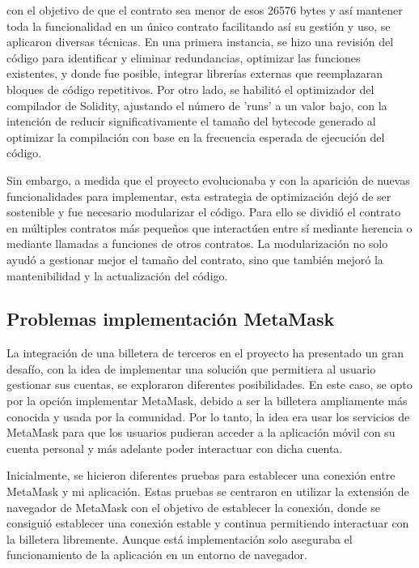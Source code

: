 con el objetivo de que el contrato sea menor de esos 26576 bytes y así mantener toda la funcionalidad en un único contrato facilitando así su gestión y uso, se aplicaron diversas técnicas.
En una primera instancia, se hizo una revisión del código para identificar y eliminar redundancias, optimizar las funciones existentes, y donde fue posible, integrar librerías externas que reemplazaran bloques de código repetitivos.
Por otro lado, se habilitó el optimizador del compilador de Solidity, ajustando el número de 'runs' a un valor bajo, con la intención de reducir significativamente el tamaño del bytecode generado al optimizar la compilación con base en la frecuencia esperada de ejecución del código.

Sin embargo, a medida que el proyecto evolucionaba y con la aparición de nuevas funcionalidades para implementar, esta estrategia de optimización dejó de ser sostenible y fue necesario modularizar el código. 
Para ello se dividió el contrato en múltiples contratos más pequeños que interactúen entre sí mediante herencia o mediante llamadas a funciones de otros contratos.
La modularización no solo ayudó a gestionar mejor el tamaño del contrato, sino que también mejoró la mantenibilidad y la actualización del código.



\subsection{Problemas implementación MetaMask}

La integración de una billetera de terceros en el proyecto ha presentado un gran desafío, con la idea de implementar una solución que permitiera al usuario gestionar sus cuentas, se exploraron diferentes posibilidades.
En este caso, se opto por la opción implementar MetaMask, debido a ser la billetera ampliamente más conocida y usada por la comunidad. 
Por lo tanto, la idea era usar los servicios de MetaMask para que los usuarios pudieran acceder a la aplicación móvil con su cuenta personal y más adelante poder interactuar con dicha cuenta.

Inicialmente, se hicieron diferentes pruebas para establecer una conexión entre MetaMask y mi aplicación. Estas pruebas se centraron en utilizar la extensión de navegador de MetaMask con el objetivo de establecer la conexión, donde se consiguió establecer una conexión estable y continua permitiendo interactuar con la billetera libremente. Aunque está implementación solo aseguraba el funcionamiento de la aplicación en un entorno de navegador.

